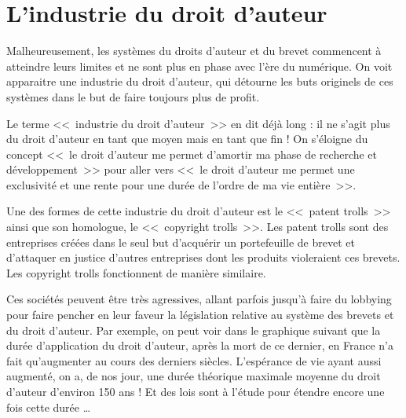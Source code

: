 \section{L'industrie du droit d'auteur}

Malheureusement, les systèmes du droits d'auteur et du brevet commencent à atteindre leurs limites et ne sont plus en phase avec l'ère du numérique.
On voit apparaitre une industrie du droit d'auteur, qui détourne les buts originels de ces systèmes dans le but de faire toujours plus de profit.

Le terme <<~industrie du droit d'auteur~>> en dit déjà long : il ne s'agit plus du droit d'auteur en tant que moyen mais en tant que fin !
On s'éloigne du concept <<~le droit d'auteur me permet d'amortir ma phase de recherche et développement~>> pour aller vers <<~le droit d'auteur me permet une exclusivité et une rente pour une durée de l'ordre de ma vie entière~>>.

Une des formes de cette industrie du droit d'auteur est le <<~patent trolls~>> ainsi que son homologue, le <<~copyright trolls~>>.
Les patent trolls sont des entreprises créées dans le seul but d'acquérir un portefeuille de brevet et d'attaquer en justice d'autres entreprises dont les produits violeraient ces brevets.
Les copyright trolls fonctionnent de manière similaire.

Ces sociétés peuvent être très agressives, allant parfois jusqu'à faire du lobbying pour faire pencher en leur faveur la législation relative au système des brevets et du droit d'auteur.
Par exemple, on peut voir dans le graphique suivant que la durée d'application du droit d'auteur, après la mort de ce dernier, en France n'a fait qu'augmenter au cours des derniers siècles.
L'espérance de vie ayant aussi augmenté, on a, de nos jour, une durée théorique maximale moyenne du droit d'auteur d'environ 150 ans ! Et des lois sont à l'étude pour étendre encore une fois cette durée \dots{}

